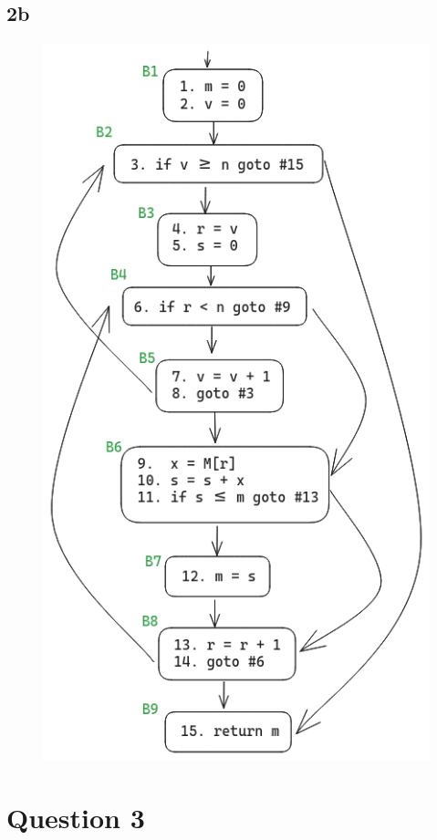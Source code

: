 \documentclass{article}
\begin{document}
    \subsection*{2b}
    \begin{figure}[H]
        \includegraphics[width=1\textwidth]{hw4-cfg2.png}
    \end{figure}

    \section*{Question 3}
\end{document}
